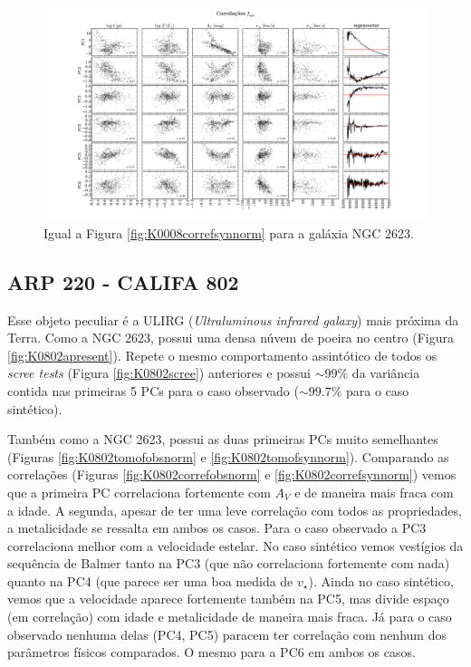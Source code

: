 \begin{figure}
    \includegraphics[width=1.3\textwidth, angle=-90]{figuras/K0213-correl-f_syn_norm-PCvsPhys.pdf}
	\caption[Correlações PCs vs. par\^ametros f\'isicos - $f_{syn}$ - NGC 2623.]
	{Igual a Figura \ref{fig:K0008correfsynnorm} para a galáxia NGC 2623.}
    \label{fig:K0213correfsynnorm}
\end{figure}

\subsection{ARP 220 - CALIFA 802}

Esse objeto peculiar é a ULIRG ({\em Ultraluminous infrared galaxy}) mais próxima da Terra. Como a NGC 2623, possui uma
densa núvem de poeira no centro (Figura \ref{fig:K0802apresent}). Repete o mesmo comportamento assintótico de todos os
{\em scree tests} (Figura \ref{fig:K0802scree}) anteriores e possui $\sim 99\%$ da variância contida nas primeiras 5 PCs
para o caso observado ($\sim 99.7\%$ para o caso sintético).

Também como a NGC 2623, possui as duas primeiras PCs muito semelhantes (Figuras \ref{fig:K0802tomofobsnorm} e
\ref{fig:K0802tomofsynnorm}). Comparando as correlações (Figuras \ref{fig:K0802correfobsnorm} e
\ref{fig:K0802correfsynnorm}) vemos que a primeira PC correlaciona fortemente com $A_V$ e de maneira mais fraca com a
idade. A segunda, apesar de ter uma leve correlação com todos as propriedades, a metalicidade se ressalta em ambos os
casos. Para o caso observado a PC3 correlaciona melhor com a velocidade estelar. No caso sintético vemos vestígios da
sequência de Balmer tanto na PC3 (que não correlaciona fortemente com nada) quanto na PC4 (que parece ser uma boa medida
de $v_\star$). Ainda no caso sintético, vemos que a velocidade aparece fortemente também na PC5, mas divide espaço (em
correlação) com idade e metalicidade de maneira mais fraca. Já para o caso observado nenhuma delas (PC4, PC5) paracem
ter correlação com nenhum dos parâmetros físicos comparados. O mesmo para a PC6 em ambos os casos.

